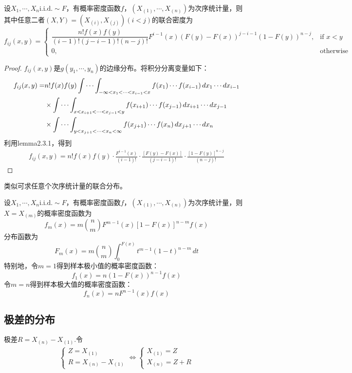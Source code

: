 \documentclass{ctexbook}
\newcommand{\iid}{\text{i.i.d.}}          %
\begin{document}
\begin{theorem}[两个次序统计量的联合分布]
    设$X_1,\cdots,X_n\iid\sim F$，有概率密度函数$f$，$(X_{(1)},\cdots,X_{(n)})$为次序统计量，则其中任意二者$(X,Y)=(X_{(i)},X_{(j)})(i<j)$的联合密度为
    $$f_{ij}(x,y)=\begin{cases}
        \dfrac{n!f(x)f(y)}{(i-1)!(j-i-1)!(n-j)!}F^{i-1}(x)(F(y)-F(x))^{j-i-1}(1-F(y))^{n-j},&\text{if }x<y\\
        0,&\text{otherwise}
    \end{cases}$$
\end{theorem}
\begin{proof}
    $f_{ij}(x,y)$是$g(y_1,\cdots,y_n)$的边缘分布。将积分分离变量如下：
    \begin{align*}
        f_{ij}(x,y)=&n!f(x)f(y)\idotsint_{-\infty<x_1<\cdots<x_{i-1}<x}f(x_1)\cdots f(x_{i-1})\,dx_1\cdots dx_{i-1}\\
        &\times \idotsint_{x<x_{i+1}<\cdots<x_{j-1}<y}f(x_{i+1})\cdots f(x_{j-1})\,dx_{i+1}\cdots dx_{j-1}\\
        &\times\idotsint_{y<x_{j+1}<\cdots<x_n<\infty}f(x_{j+1})\cdots f(x_n)\,dx_{j+1}\cdots dx_n
    \end{align*}
    利用lemma2.3.1，得到\begin{align*}
        f_{ij}(x,y)=n!f(x)f(y)\cdot\frac{F^{i-1}(x)}{(i-1)!}\cdot\frac{[F(y)-F(x)]}{(j-i-1)!}\cdot\frac{[1-F(y)]^{n-j}}{(n-j)!}
    \end{align*}
\end{proof}

类似可求任意个次序统计量的联合分布。

\begin{theorem}[单个次序统计量的分布]
    设$X_1,\cdots,X_n\iid\sim F$，有概率密度函数$f$，$(X_{(1)},\cdots,X_{(n)})$为次序统计量，则$X=X_{(m)}$的概率密度函数为
    $$f_m(x)=m\binom{n}{m}F^{m-1}(x)[1-F(x)]^{n-m}f(x)$$
    分布函数为
    $$F_m(x)=m\binom{n}{m}\int_{0}^{F(x)}t^{m-1}(1-t)^{n-m}\,dt$$
    特别地，令$m=1$得到样本极小值的概率密度函数：
    $$f_1(x)=n(1-F(x))^{n-1}f(x)$$
    令$m=n$得到样本极大值的概率密度函数：
    $$f_n(x)=nF^{n-1}(x)f(x)$$
\end{theorem}

\subsection{极差的分布}

极差$R=X_{(n)}-X_{(1)}$.令\begin{align*}
    \begin{cases}
        Z=X_{(1)}\\
        R=X_{(n)}-X_{(1)}
    \end{cases}\iff\begin{cases}
        X_{(1)}=Z\\
        X_{(n)}=Z+R
    \end{cases}
\end{align*}
\end{document}
